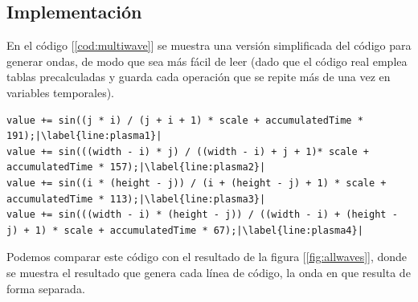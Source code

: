 \subsection{Implementación}

En el código [\ref{cod:multiwave}] se muestra una versión simplificada del código para generar ondas, de modo que sea más fácil de leer (dado que el código real emplea tablas precalculadas y guarda cada operación que se repite más de una vez en variables temporales).\\

\begin{lstlisting}[style=C-color, caption={Combinación de distintas ondas}, label=cod:multiwave, escapechar=|]
value += sin((j * i) / (j + i + 1) * scale + accumulatedTime * 191);|\label{line:plasma1}|
value += sin(((width - i) * j) / ((width - i) + j + 1)* scale + accumulatedTime * 157);|\label{line:plasma2}|
value += sin((i * (height - j)) / (i + (height - j) + 1) * scale + accumulatedTime * 113);|\label{line:plasma3}|
value += sin(((width - i) * (height - j)) / ((width - i) + (height - j) + 1) * scale + accumulatedTime * 67);|\label{line:plasma4}|
\end{lstlisting}

Podemos comparar este código con el resultado de la figura [\ref{fig:allwaves}], donde se muestra el resultado que genera cada línea de código, la onda en que resulta de forma separada.\\

